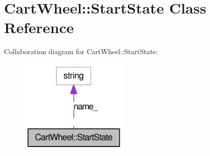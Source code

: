 \hypertarget{classCartWheel_1_1StartState}{
\section{CartWheel::StartState Class Reference}
\label{classCartWheel_1_1StartState}
}


Collaboration diagram for CartWheel::StartState:\nopagebreak
\begin{figure}[H]
\begin{center}
\leavevmode
\includegraphics[width=148pt]{classCartWheel_1_1StartState__coll__graph}
\end{center}
\end{figure}
